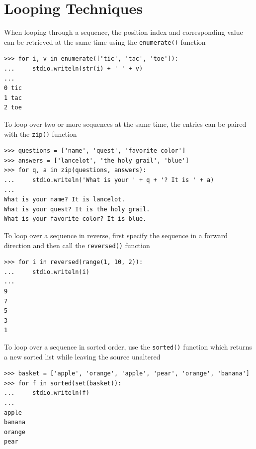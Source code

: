 \documentclass[8pt,a4paper,compress]{beamer}
\begin{document}
\section{Looping Techniques}
\begin{frame}[fragile]
\pause

When looping through a sequence, the position index and corresponding value can be retrieved at the same time using the \lstinline{enumerate()} function
\begin{lstlisting}[language={}]
>>> for i, v in enumerate(['tic', 'tac', 'toe']):
...     stdio.writeln(str(i) + ' ' + v)
...
0 tic
1 tac
2 toe
\end{lstlisting}

\pause
\bigskip

To loop over two or more sequences at the same time, the entries can be paired with the \lstinline{zip()} function
\begin{lstlisting}[language={}]
>>> questions = ['name', 'quest', 'favorite color']
>>> answers = ['lancelot', 'the holy grail', 'blue']
>>> for q, a in zip(questions, answers):
...     stdio.writeln('What is your ' + q + '? It is ' + a)
...
What is your name? It is lancelot.
What is your quest? It is the holy grail.
What is your favorite color? It is blue.
\end{lstlisting}
\end{frame}

\begin{frame}[fragile]
\pause

To loop over a sequence in reverse, first specify the sequence in a forward direction and then call the \lstinline{reversed()} function
\begin{lstlisting}[language={}]
>>> for i in reversed(range(1, 10, 2)):
...     stdio.writeln(i)
...
9
7
5
3
1
\end{lstlisting}

\pause
\bigskip

To loop over a sequence in sorted order, use the \lstinline{sorted()} function which returns a new sorted list while leaving the source unaltered
\begin{lstlisting}[language={}]
>>> basket = ['apple', 'orange', 'apple', 'pear', 'orange', 'banana']
>>> for f in sorted(set(basket)):
...     stdio.writeln(f)
...
apple
banana
orange
pear
\end{lstlisting}
\end{frame}
\end{document}
